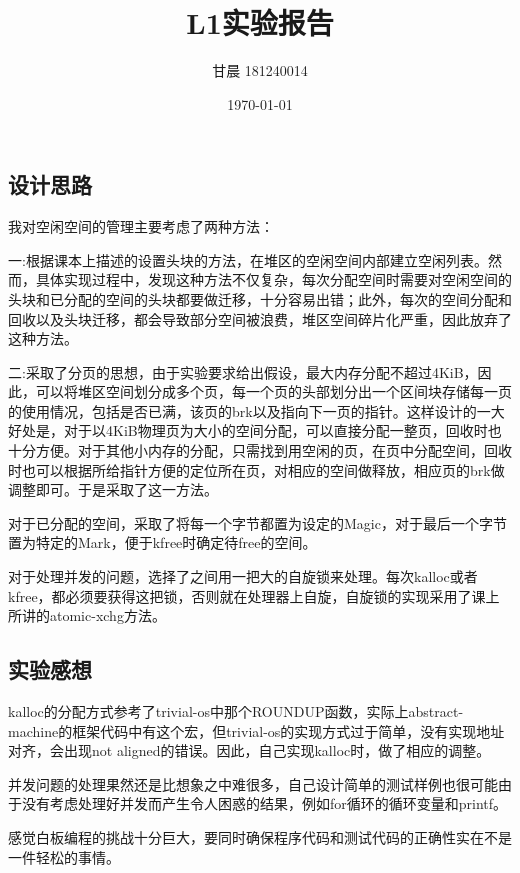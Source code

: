 \documentclass[UTF8]{ctexart}
\title{L1实验报告}
\author{甘晨 181240014}
\date{\today}
\begin{document}
\maketitle
\subsection{设计思路}
\par 我对空闲空间的管理主要考虑了两种方法：

\par 一:根据课本上描述的设置头块的方法，在堆区的空闲空间内部建立空闲列表。然而，具体实现过程中，发现这种方法不仅复杂，每次分配空间时需要对空闲空间的头块和已分配的空间的头块都要做迁移，十分容易出错；此外，每次的空间分配和回收以及头块迁移，都会导致部分空间被浪费，堆区空间碎片化严重，因此放弃了这种方法。

\par 二:采取了分页的思想，由于实验要求给出假设，最大内存分配不超过4KiB，因此，可以将堆区空间划分成多个页，每一个页的头部划分出一个区间块存储每一页的使用情况，包括是否已满，该页的brk以及指向下一页的指针。这样设计的一大好处是，对于以4KiB物理页为大小的空间分配，可以直接分配一整页，回收时也十分方便。对于其他小内存的分配，只需找到用空闲的页，在页中分配空间，回收时也可以根据所给指针方便的定位所在页，对相应的空间做释放，相应页的brk做调整即可。于是采取了这一方法。

\par 对于已分配的空间，采取了将每一个字节都置为设定的Magic，对于最后一个字节置为特定的Mark，便于kfree时确定待free的空间。

\par 对于处理并发的问题，选择了之间用一把大的自旋锁来处理。每次kalloc或者kfree，都必须要获得这把锁，否则就在处理器上自旋，自旋锁的实现采用了课上所讲的atomic-xchg方法。

\subsection{实验感想}
\par kalloc的分配方式参考了trivial-os中那个ROUNDUP函数，实际上abstract-machine的框架代码中有这个宏，但trivial-os的实现方式过于简单，没有实现地址对齐，会出现not aligned的错误。因此，自己实现kalloc时，做了相应的调整。

\par 并发问题的处理果然还是比想象之中难很多，自己设计简单的测试样例也很可能由于没有考虑处理好并发而产生令人困惑的结果，例如for循环的循环变量和printf。

\par 感觉白板编程的挑战十分巨大，要同时确保程序代码和测试代码的正确性实在不是一件轻松的事情。
\end{document}
